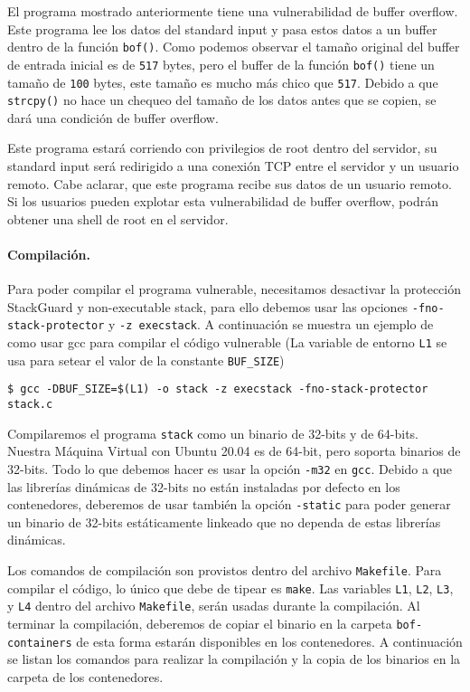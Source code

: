 El programa mostrado anteriormente tiene una vulnerabilidad de buffer overflow. Este programa lee los datos del standard input y pasa estos datos a un buffer dentro de la función {\tt bof()}. Como podemos observar el tamaño original del buffer de entrada inicial es de \texttt{517} bytes, pero el buffer de la función {\tt bof()} tiene un tamaño de \texttt{100} bytes, este tamaño es mucho más chico que \texttt{517}. Debido a que {\tt strcpy()} no hace un chequeo del tamaño de los datos antes que se copien, se dará una condición de buffer overflow.

Este programa estará corriendo con privilegios de root dentro del servidor, su standard input será redirigido a una conexión TCP entre el servidor y un usuario remoto.
Cabe aclarar, que este programa recibe sus datos de un usuario remoto.
Si los usuarios pueden explotar esta vulnerabilidad de buffer overflow, podrán obtener una shell de root en el servidor.


\paragraph{Compilación.}
Para poder compilar el programa vulnerable, necesitamos desactivar la protección StackGuard y non-executable stack, para ello debemos usar las opciones \texttt{-fno-stack-protector} y \texttt{-z execstack}.
A continuación se muestra un ejemplo de como usar gcc para compilar el código vulnerable (La variable de entorno \texttt{L1} se usa para setear el valor de la constante \texttt{BUF\_SIZE})

\begin{lstlisting}
$ gcc -DBUF_SIZE=$(L1) -o stack -z execstack -fno-stack-protector stack.c
\end{lstlisting}

Compilaremos el programa \texttt{stack} como un binario de 32-bits y de 64-bits. Nuestra Máquina Virtual con Ubuntu 20.04 es de 64-bit, pero soporta binarios de 32-bits. Todo lo que debemos hacer es usar la opción \texttt{-m32} en \texttt{gcc}.
Debido a que las librerías dinámicas de 32-bits no están instaladas por defecto en los contenedores, deberemos de usar también la opción \texttt{-static} para poder generar un binario de 32-bits estáticamente linkeado que no dependa de estas librerías dinámicas.

Los comandos de compilación son provistos dentro del archivo \texttt{Makefile}. Para compilar el código, lo único que debe de tipear es \texttt{make}. Las variables \texttt{L1}, \texttt{L2}, \texttt{L3}, y \texttt{L4} dentro del archivo \texttt{Makefile}, serán usadas durante la compilación.
Al terminar la compilación, deberemos de copiar el binario en la carpeta \texttt{bof-containers} de esta forma estarán disponibles en los contenedores. 
A continuación se listan los comandos para realizar la compilación y la copia de los binarios en la carpeta de los contenedores.

